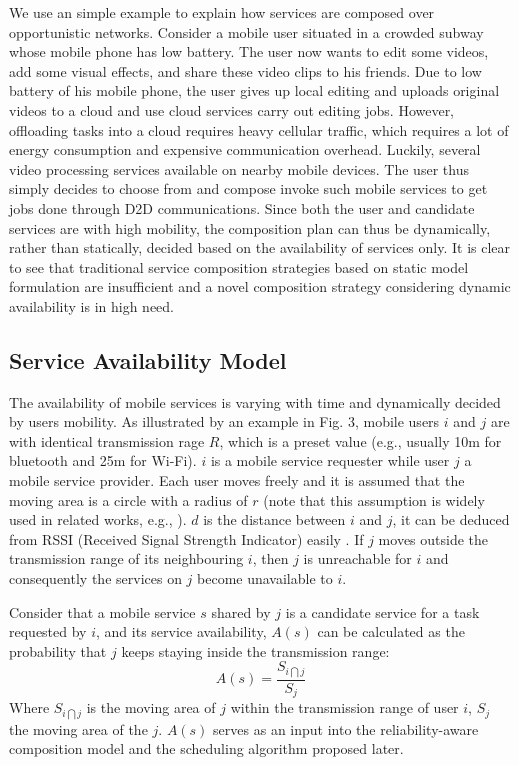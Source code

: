 \documentclass[journal]{IEEEtran}
\begin{document}
We use an simple example to explain how services are composed over opportunistic networks.
Consider a mobile user situated in a crowded subway whose mobile phone has low battery. 
The user now wants to edit some videos, add some visual effects, and share these video clips to his friends.
Due to low battery of his mobile phone, the user gives up local editing and uploads original videos to a cloud and use cloud services carry out editing jobs. However, offloading tasks into a cloud requires heavy cellular traffic, which requires a lot of energy consumption and expensive communication overhead.
Luckily, several video processing services available on nearby mobile devices. The user thus simply decides to choose from and compose invoke such mobile services to get jobs done through D2D communications. 
Since both the user and candidate services are with high mobility, the composition plan can thus be dynamically, rather than statically, decided based on the availability of services only.  It is clear to see that traditional service composition strategies based on static model formulation are insufficient and a novel composition strategy considering dynamic availability is in high need.

\subsection{Service Availability Model}

The availability of mobile services is varying with time and dynamically decided by users mobility. 
As illustrated by an example in Fig. 3, mobile users $i$ and $j$ are with identical transmission rage $R$, which is a preset value (e.g., usually 10m for bluetooth and 25m for Wi-Fi). $i$ is a mobile service requester while user $j$ a mobile service provider. Each user moves freely and it is assumed that the moving area is a circle with a radius of $r$ (note that this assumption is widely used in related works, e.g., \cite{Yang2010, Deng2017, wu2001personal}). $d$ is the distance between $i$ and $j$, it can be deduced from RSSI (Received Signal Strength Indicator) easily \cite{benkic2008using}. If $j$ moves outside the transmission range of its neighbouring $i$, then $j$ is unreachable for $i$ and consequently the services on $j$ become unavailable to $i$.

Consider that a mobile service $s$ shared by $j$ is a candidate service for a task requested by $i$, and its service availability, $A(s)$ can be calculated as the probability that $j$ keeps staying inside the transmission range:
\begin{equation}
A(s) = \frac{S_{i \bigcap j}}{S_j}
\end{equation}
Where $S_{i \bigcap j}$ is the moving area of $j$ within the transmission range of user $i$, $S_j$ the moving area of the $j$. $A(s)$ serves as an input into the reliability-aware composition model and the scheduling algorithm proposed later.
\end{document}
